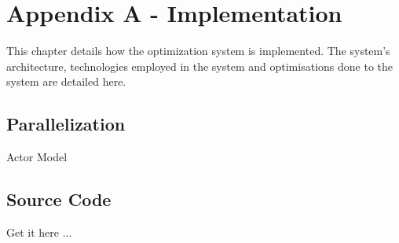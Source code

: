 
\chapter{Appendix A - Implementation}
This chapter details how the optimization system is implemented. The system's architecture, technologies employed in the system and optimisations done to the system are detailed here.

\section{Parallelization}

Actor Model

\section{Source Code}

Get it here ...

